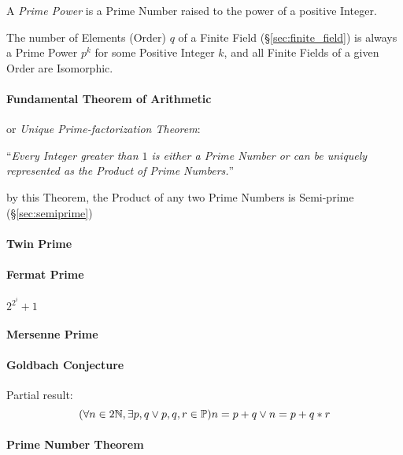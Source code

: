 A \emph{Prime Power} is a Prime Number raised to the power of a
positive Integer.

The number of Elements (Order) $q$ of a Finite Field (\S\ref{sec:finite_field})
is always a Prime Power $p^k$ for some Positive Integer $k$, and all Finite
Fields of a given Order are Isomorphic.



\paragraph{Fundamental Theorem of Arithmetic}
\label{sec:fundamental_arithmetic_theorem}\hfill

or \emph{Unique Prime-factorization Theorem}:

``\emph{Every Integer greater than $1$ is either a Prime Number or can be
  uniquely represented as the Product of Prime Numbers.}''

by this Theorem, the Product of any two Prime Numbers is Semi-prime
(\S\ref{sec:semiprime})



\paragraph{Twin Prime}\label{sec:twin_prime}\hfill

\paragraph{Fermat Prime}\label{sec:fermat_prime}\hfill

$2^{2^i} + 1$



\paragraph{Mersenne Prime}\label{sec:mersenne_prime}\hfill

\paragraph{Goldbach Conjecture}\label{sec:goldbach_conjecture}\hfill

Partial result:
\[
  (\forall n \in 2\mathbb{N}, \exists p,q \vee p,q,r \in \mathbb{P})
  n = p + q \vee n = p + q * r
\]



\paragraph{Prime Number Theorem}\label{sec:prime_number_theorem}\hfill



